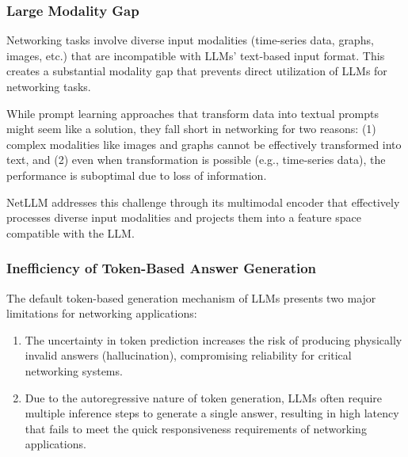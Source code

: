 \documentclass[twocolumn]{article}
\begin{document}
\subsubsection{Large Modality Gap}
Networking tasks involve diverse input modalities (time-series data, graphs, images, etc.) that are incompatible with LLMs' text-based input format. This creates a substantial modality gap that prevents direct utilization of LLMs for networking tasks.

While prompt learning approaches that transform data into textual prompts might seem like a solution, they fall short in networking for two reasons: (1) complex modalities like images and graphs cannot be effectively transformed into text, and (2) even when transformation is possible (e.g., time-series data), the performance is suboptimal due to loss of information.


NetLLM addresses this challenge through its multimodal encoder that effectively processes diverse input modalities and projects them into a feature space compatible with the LLM.

\subsubsection{Inefficiency of Token-Based Answer Generation}
The default token-based generation mechanism of LLMs presents two major limitations for networking applications:

\begin{enumerate}[itemsep=0pt, topsep=2pt, parsep=0pt]
  \item The uncertainty in token prediction increases the risk of producing physically invalid answers (hallucination), compromising reliability for critical networking systems.
  \item Due to the autoregressive nature of token generation, LLMs often require multiple inference steps to generate a single answer, resulting in high latency that fails to meet the quick responsiveness requirements of networking applications.
\end{enumerate}

\end{document}
